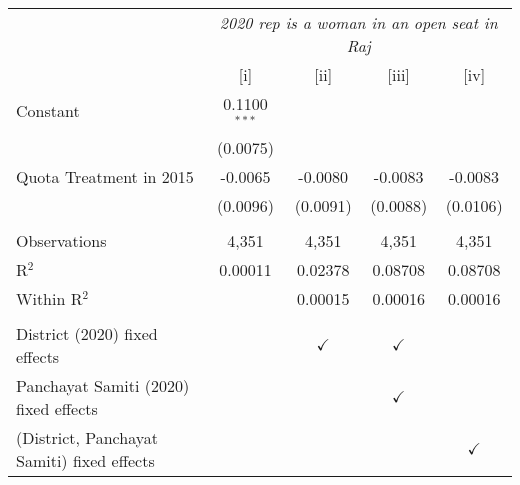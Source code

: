
\begingroup
\centering
\begin{tabular}{lcccc}
   \toprule
    & \multicolumn{4}{c}{\textit{2020 rep is a woman in an open seat in Raj}}\\
                                              & [i]            & [ii]          & [iii]         & [iv]\\  
   \midrule 
   Constant                                   & 0.1100$^{***}$ &               &               &   \\   
                                              & (0.0075)       &               &               &   \\   
   Quota Treatment in 2015                    & -0.0065        & -0.0080       & -0.0083       & -0.0083\\   
                                              & (0.0096)       & (0.0091)      & (0.0088)      & (0.0106)\\   
    \\
   Observations                               & 4,351          & 4,351         & 4,351         & 4,351\\  
   R$^2$                                      & 0.00011        & 0.02378       & 0.08708       & 0.08708\\  
   Within R$^2$                               &                & 0.00015       & 0.00016       & 0.00016\\  
    \\
   District (2020) fixed effects              &                & $\checkmark$  & $\checkmark$  & \\  
   Panchayat Samiti (2020) fixed effects      &                &               & $\checkmark$  & \\  
   (District, Panchayat Samiti) fixed effects &                &               &               & $\checkmark$\\   
   \bottomrule
\end{tabular}
\par\endgroup


